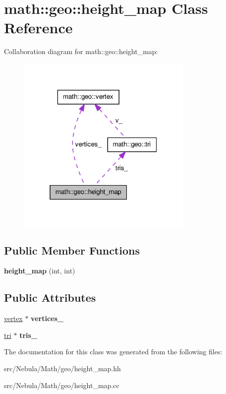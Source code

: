 \hypertarget{classmath_1_1geo_1_1height__map}{\section{math\-:\-:geo\-:\-:height\-\_\-map \-Class \-Reference}
\label{classmath_1_1geo_1_1height__map}
}


\-Collaboration diagram for math\-:\-:geo\-:\-:height\-\_\-map\-:\nopagebreak
\begin{figure}[H]
\begin{center}
\leavevmode
\includegraphics[width=241pt]{classmath_1_1geo_1_1height__map__coll__graph}
\end{center}
\end{figure}
\subsection*{\-Public \-Member \-Functions}
\begin{DoxyCompactItemize}
\item 
\hypertarget{classmath_1_1geo_1_1height__map_a56685f77f9750167f419366039118113}{{\bfseries height\-\_\-map} (int, int)}\label{classmath_1_1geo_1_1height__map_a56685f77f9750167f419366039118113}

\end{DoxyCompactItemize}
\subsection*{\-Public \-Attributes}
\begin{DoxyCompactItemize}
\item 
\hypertarget{classmath_1_1geo_1_1height__map_add2b5f09f8bf6a3d7c674afd0fcb0ee4}{\hyperlink{classmath_1_1geo_1_1vertex}{vertex} $\ast$ {\bfseries vertices\-\_\-}}\label{classmath_1_1geo_1_1height__map_add2b5f09f8bf6a3d7c674afd0fcb0ee4}

\item 
\hypertarget{classmath_1_1geo_1_1height__map_a29abf1041ebd17777d88a2b55ef82535}{\hyperlink{classmath_1_1geo_1_1tri}{tri} $\ast$ {\bfseries tris\-\_\-}}\label{classmath_1_1geo_1_1height__map_a29abf1041ebd17777d88a2b55ef82535}

\end{DoxyCompactItemize}


\-The documentation for this class was generated from the following files\-:\begin{DoxyCompactItemize}
\item 
src/\-Nebula/\-Math/geo/height\-\_\-map.\-hh\item 
src/\-Nebula/\-Math/geo/height\-\_\-map.\-cc\end{DoxyCompactItemize}
